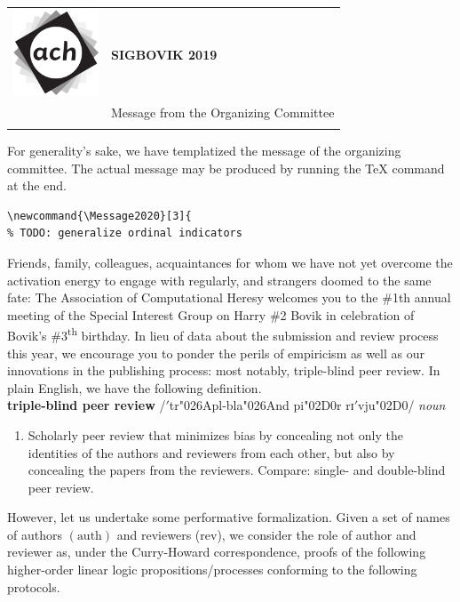 \documentclass[12pt]{article}
\newcommand{\auth}{\text{auth}}
\newcommand{\rev}{\text{rev}}
\begin{document}
{\sffamily
\begin{tabular}{ll}
\multirow{3}{*}{\includegraphics[width=1in]{ach.png}}\\
& \textbf{\Huge{SIGBOVIK 2019}} \\ &\\
& \LARGE{Message from the Organizing Committee} \\
&\\
\hline
\end{tabular}}
\vspace{2em}
\thispagestyle{empty}

For generality’s sake, we have templatized the message of the organizing committee. The actual message may be produced by running the TeX command at the end.

\begin{verbatim}
\newcommand{\Message2020}[3]{
% TODO: generalize ordinal indicators
\end{verbatim}
Friends, family, colleagues, acquaintances for whom we have not yet overcome the activation energy to engage with regularly, and strangers doomed to the same fate: The Association of Computational Heresy welcomes you to the \#1th annual meeting of the Special Interest Group on Harry \#2 Bovik in celebration of Bovik’s \#3\textsuperscript{th} birthday. In lieu of data about the submission and review process this year, we encourage you to ponder the perils of empiricism as well as our innovations in the publishing process: most notably, triple-blind peer review. In plain English, we have the following definition.\\

\textbf{triple-blind peer review} /$'$tr\char"026Apl-bla\char"026And pi\char"02D0r rɪ$'$vju\char"02D0/ \emph{noun}
\begin{enumerate}
\item Scholarly peer review that minimizes bias by concealing not only the identities of the authors and reviewers from each other, but also by concealing the papers from the reviewers. Compare: single- and double-blind peer review.
\end{enumerate}

However, let us undertake some performative formalization. Given a set of names of authors $(\auth)$ and reviewers ($\rev$), we consider the role of author and reviewer as, under the Curry-Howard correspondence, proofs of the following higher-order linear logic propositions/processes conforming to the following protocols.
\end{document}
